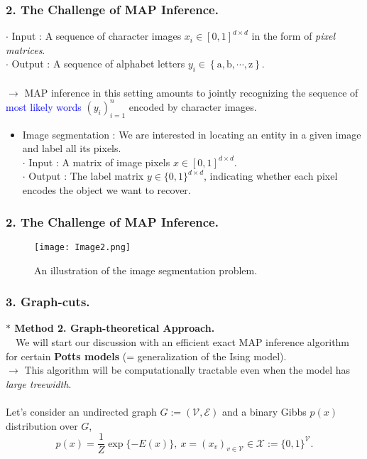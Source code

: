 \documentclass[11pt]{beamer}
\newtheorem*{pf of lemma}{\it Proof of the \normalfont \bf Lemma}
\newtheorem*{pf of claim}{\it Proof of the \normalfont \sf Claim}
\begin{document}
\begin{frame}
\frametitle{2. The Challenge of MAP Inference.}
$\cdot$ Input : A sequence of character images $x_i \in [0,1]^{d \times d}$ in the form of \textit{pixel matrices}. \\
$\cdot$ Output : A sequence of alphabet letters $y_i \in \left\{\mbox{a}, \mbox{b}, \cdots, \mbox{z} \right\}.$ \\ \ \\
$\rightarrow$ MAP inference in this setting amounts to jointly recognizing the sequence of \textcolor{blue}{most likely words} $(y_i)_{i=1}^{n}$ encoded by character images.

\begin{itemize}
\item Image segmentation : We are interested in locating an entity in a given image and label all its pixels. \\
$\cdot$ Input : A matrix of image pixels $x \in [0, 1]^{d \times d}$. \\
$\cdot$ Output : The label matrix $y \in \{0,1\}^{d \times d}$, indicating whether each pixel encodes the object we want to recover.
\end{itemize}

\end{frame}

\begin{frame}
\frametitle{2. The Challenge of MAP Inference.}
\begin{figure}[h]
\begin{center}
\texttt{[image: Image2.png]}
\caption{An illustration of the image segmentation problem.}
\end{center}
\end{figure}

\end{frame}

\begin{frame}
\frametitle{3. Graph-cuts.}
\textbf{$\ast$ Method 2. Graph-theoretical Approach.} \\
\ \ \indent We will start our discussion with an efficient exact MAP inference algorithm for certain \textbf{Potts models} (= generalization of the Ising model). \\
$\rightarrow$ This algorithm will be computationally tractable even when the model has \textit{large treewidth}. \\ \ \\
Let's consider an undirected graph $G := (\mathcal{V}, \mathcal{E})$ and a binary Gibbs $p(x)$ distribution over $G$,
$$p(x) = \frac{1}{Z} \exp\{- E(x)\}, \ x = (x_v)_{v \in \mathcal{V}} \in \mathcal{X} := \{0,1\}^{\mathcal{V}}.$$
\end{frame}
\end{document}
